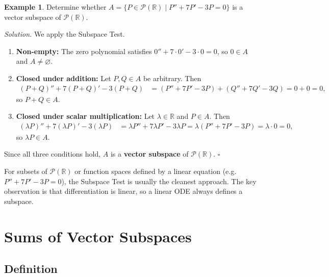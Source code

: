 \documentclass[11pt, a4paper, notitlepage]{report}
\theoremstyle{definition}
\newtheorem{example}[theorem]{Example}
\theoremstyle{remark}
\begin{document}
\begin{example}\label{ex:poly-ode-subspace}
Determine whether $A = \{P \in \mathscr{P}(\mathbb{R}) \mid P'' + 7P' - 3P = 0\}$ is a vector subspace of $\mathscr{P}(\mathbb{R})$.

\emph{Solution.} We apply the Subspace Test.
\begin{enumerate}
  \item \textbf{Non-empty:} The zero polynomial satisfies $0'' + 7 \cdot 0' - 3 \cdot 0 = 0$, so $0 \in A$ and $A \neq \varnothing$.
  \item \textbf{Closed under addition:} Let $P, Q \in A$ be arbitrary. Then
  \begin{align*}
    (P+Q)'' + 7(P+Q)' - 3(P+Q) &= (P'' + 7P' - 3P) + (Q'' + 7Q' - 3Q) = 0 + 0 = 0,
  \end{align*}
  so $P + Q \in A$.
  \item \textbf{Closed under scalar multiplication:} Let $\lambda \in \mathbb{R}$ and $P \in A$. Then
  \begin{align*}
    (\lambda P)'' + 7(\lambda P)' - 3(\lambda P) &= \lambda P'' + 7\lambda P' - 3\lambda P = \lambda(P'' + 7P' - 3P) = \lambda \cdot 0 = 0,
  \end{align*}
  so $\lambda P \in A$.
\end{enumerate}
Since all three conditions hold, $A$ is a \textbf{vector subspace} of $\mathscr{P}(\mathbb{R})$. $\square$
\end{example}

\begin{examtip}[title={Exam Tip: Polynomial and Function Subspaces}]
For subsets of $\mathscr{P}(\mathbb{R})$ or function spaces defined by a linear equation (e.g.\ $P'' + 7P' - 3P = 0$), the Subspace Test is usually the cleanest approach. The key observation is that differentiation is linear, so a linear ODE always defines a subspace.
\end{examtip}

\section{Sums of Vector Subspaces}
\label{sec:sum-subspaces}

\subsection{Definition}
\end{document}
